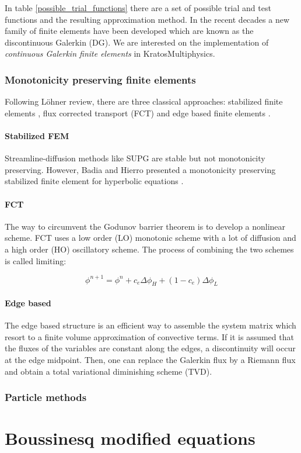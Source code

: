 In table \ref{possible_trial_functions} there are a set of possible trial and test functions and the resulting approximation method. In the recent decades a new family of finite elements have been developed which are known as the discontinuous Galerkin (DG). We are interested on the implementation of \emph{continuous Galerkin finite elements} in KratosMultiphysics.



\subsubsection{Monotonicity preserving finite elements}

Following Löhner review, there are three classical approaches: stabilized finite elements \cite{lohner2008}, flux corrected transport (FCT) \cite{lohner2008ch9} and edge based finite elements \cite{lohner2008ch10}.

\paragraph*{Stabilized FEM} Streamline-diffusion methods like SUPG are stable but not
monotonicity preserving. However, Badia and Hierro presented a monotonicity preserving stabilized finite element for hyperbolic equations \cite{badia2014}.

\paragraph*{FCT} The way to circumvent the Godunov barrier theorem \cite{godunov1959} is to develop a nonlinear scheme. FCT uses a low order (LO) monotonic scheme with a lot of diffusion and a high order (HO) oscillatory scheme. The process of combining the two schemes is called limiting:

\begin{equation}
\phi^{n+1} = \phi^n + c_e\Delta \phi_H + (1-c_e)\Delta \phi_L
\end{equation}

\paragraph*{Edge based} The edge based structure is an efficient way to assemble the system matrix which resort to a
finite volume approximation of convective terms. If it is assumed that the fluxes of the variables are constant along the edges, a discontinuity will occur at the edge midpoint. Then, one can replace the Galerkin flux by a Riemann flux and obtain a total variational diminishing scheme (TVD).


\subsubsection{Particle methods}



\section{Boussinesq modified equations}


